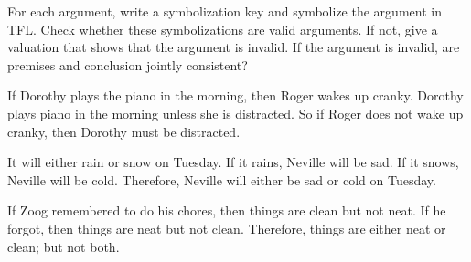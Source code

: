 \begin{practiceproblems}
\problempart
For each argument, write a symbolization key and symbolize the argument in TFL. Check whether these symbolizations are valid arguments. If not, give a valuation that shows that the argument is invalid. If the argument is invalid, are premises and conclusion jointly consistent?
\begin{earg}
\item If Dorothy plays the piano in the morning, then Roger wakes up cranky. Dorothy plays piano in the morning unless she is distracted. So if Roger does not wake up cranky, then Dorothy must be distracted.
\item It will either rain or snow on Tuesday. If it rains, Neville will be sad. If it snows, Neville will be cold. Therefore, Neville will either be sad or cold on Tuesday.
\item If Zoog remembered to do his chores, then things are clean but not neat. If he forgot, then things are neat but not clean. Therefore, things are either neat or clean; but not both.
\end{earg}


\end{practiceproblems}
